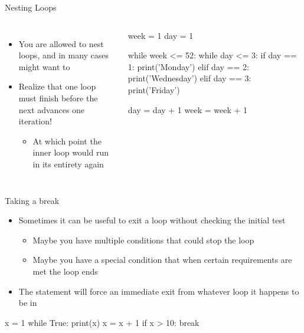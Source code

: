 \documentclass[pdf, aspectratio=169, 12pt]{beamer}
\begin{document}
\begin{frame}[fragile]{Nesting Loops}
	\begin{columns}
		\begin{itemize}
			\item You are allowed to nest loops, and in many cases might want to
			\item Realize that one loop must finish \alert{before} the next advances one iteration!
				\begin{itemize}
					\item At which point the inner loop would run in its entirety again
				\end{itemize}
		\end{itemize}
		
		\begin{pythoncode}
			week = 1
			day = 1

			while week <= 52:
				while day <= 3:
					if day == 1:
						print('Monday')
					elif day == 2:
						print('Wednesday')
					elif day == 3:
						print('Friday')

					day = day + 1
				week = week + 1
		\end{pythoncode}
	\end{columns}
\end{frame}

\begin{frame}[fragile]{Taking a break}
	\vspace{5mm}
	\begin{itemize}
		\item Sometimes it can be useful to exit a loop without checking the initial test
			\begin{itemize}
				\item Maybe you have multiple conditions that could stop the loop
				\item Maybe you have a special condition that when certain requirements are met the loop ends
			\end{itemize}
		\item The  statement will force an immediate exit from whatever loop it happens to be in
	\end{itemize}
	\begin{pythoncode}
		x = 1
		while True:
			print(x)
			x = x + 1
			if x > 10:
				break
	\end{pythoncode}
\end{frame}
\end{document}
